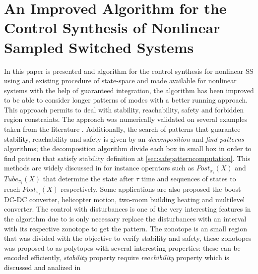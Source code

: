 \section{An Improved Algorithm for the Control Synthesis of Nonlinear Sampled Switched Systems}
    \label{sec:safealgorithm}
    In this paper is presented and algorithm for the control synthesis for
    nonlinear \ac{SS} using and existing procedure of state-space 
    and made available for nonlinear systems with the help of guaranteed 
    integration, the algorithm has been improved to be able to consider longer 
    patterns of modes with a better running approach. This approach permits 
    to deal with stability, reachability, safety and forbidden region 
    constraints. The approach was numerically validated
    on several examples taken from the literature \cite{le2017improved}. Additionally, the search of patterns that guarantee 
    stability, reachability and safety is given by an \emph{decomposition}
    and \emph{find patterns} algorithms; the decomposition algorithm 
    divide each box in small box in order to find pattern that 
    satisfy stability definition at \autoref{sec:safepatterncomputation}. 
    This methods are widely discussed in \citep{fribourg2014finite} for instance 
    operators such as $Post_{\pi_i}(X)$ and $Tube_{ \pi_i}(X)$ that determine 
    the state after $\tau$ time and sequences of states to reach $Post_{\pi_i}(X)$ 
    respectively. Some applications are also proposed the boost DC-DC converter,
    helicopter motion, two-room building heating and multilevel converter.
    The control with disturbances is one of the very interesting features 
    in the algorithm due to is only necessary replace the disturbances with
    an interval with its respective zonotope to get the pattern. The zonotope
    is an small region that was divided with the objective to verify 
    stability and safety, these zonotopes was proposed to as polytopes with
    several interesting properties: these can be encoded efficiently, 
    \emph{stability} property require \emph{reachibility} property which is 
    discussed and analized in \citep*{girard2005reachability}

    

    
    





